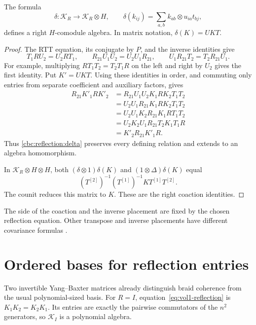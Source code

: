\begin{proposition}\label{cbc:reflection:coaction}
The formula
\begin{equation}\label{cbc:reflection:delta}
 \delta:\mathcal K_R\longrightarrow\mathcal K_R\otimes H,
 \qquad
 \delta(k_{ij})=\sum_{a,b}k_{ab}\otimes u_{ia}t_{bj},
\end{equation}
defines a right $H$-comodule algebra.  In matrix notation,
$\delta(K)=UKT$.
\end{proposition}
\begin{proof}
The RTT equation, its conjugate by $P$, and the inverse identities give
\[
 T_1R U_2=U_2R T_1,\qquad
 R_{21}U_1U_2=U_2U_1R_{21},\qquad
 U_1R_{21}T_2=T_2R_{21}U_1.
\]
For example, multiplying $RT_1T_2=T_2T_1R$ on the left and right by
$U_2$ gives the first identity.
Put $K'=UKT$.  Using these identities in order, and commuting only
entries from separate coefficient and auxiliary factors, gives
\[
 \begin{aligned}
 R_{21}K'_1R K'_2
 &=R_{21}U_1U_2K_1R K_2T_1T_2\\
 &=U_2U_1R_{21}K_1R K_2T_1T_2\\
 &=U_2U_1K_2R_{21}K_1R T_1T_2\\
 &=U_2K_2U_1R_{21}T_2K_1T_1R\\
 &=K'_2R_{21}K'_1R.
 \end{aligned}
\]
Thus \eqref{cbc:reflection:delta} preserves every defining relation and
extends to an algebra homomorphism.

In $\mathcal K_R\otimes H\otimes H$, both
$(\delta\otimes1)\delta(K)$ and $(1\otimes\Delta)\delta(K)$ equal
\[
 (T^{[2]})^{-1}(T^{[1]})^{-1}K T^{[1]}T^{[2]}.
\]
The counit reduces this matrix to $K$.
These are the right coaction identities.
\end{proof}

The side of the coaction and the inverse placement are fixed by the
chosen reflection equation.  Other transpose and inverse placements have
different covariance formulas
\cite[\S6.2]{KulishSklyaninReflection1992}.

\section{Ordered bases for reflection entries}
Two invertible Yang--Baxter matrices already distinguish braid coherence
from the usual polynomial-sized basis.
For $R=I$, equation~\eqref{eq:vol1-reflection} is $K_1K_2=K_2K_1$.
Its entries are exactly the pairwise commutators of the $n^2$ generators,
so $\mathcal K_I$ is a polynomial algebra.

